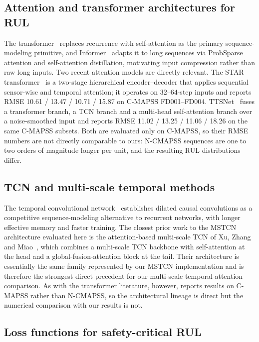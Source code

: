 \subsection{Attention and transformer architectures for RUL}

The transformer~\cite{vaswani2017attention} replaces recurrence with self-attention as the primary sequence-modeling primitive, and Informer~\cite{zhou2021informer} adapts it to long sequences via ProbSparse attention and self-attention distillation, motivating input compression rather than raw long inputs. Two recent attention models are directly relevant. The STAR transformer~\cite{fan2024star} is a two-stage hierarchical encoder--decoder that applies sequential sensor-wise and temporal attention; it operates on $32$--$64$-step inputs and reports RMSE 10.61 / 13.47 / 10.71 / 15.87 on C-MAPSS FD001--FD004. TTSNet~\cite{ttsnet2025} fuses a transformer branch, a TCN branch and a multi-head self-attention branch over a noise-smoothed input and reports RMSE 11.02 / 13.25 / 11.06 / 18.26 on the same C-MAPSS subsets. Both are evaluated only on C-MAPSS, so their RMSE numbers are not directly comparable to ours: N-CMAPSS sequences are one to two orders of magnitude longer per unit, and the resulting RUL distributions differ.

\subsection{TCN and multi-scale temporal methods}

The temporal convolutional network~\cite{bai2018tcn} establishes dilated causal convolutions as a competitive sequence-modeling alternative to recurrent networks, with longer effective memory and faster training. The closest prior work to the MSTCN architecture evaluated here is the attention-based multi-scale TCN of Xu, Zhang and Miao~\cite{xu2024msattn}, which combines a multi-scale TCN backbone with self-attention at the head and a global-fusion-attention block at the tail. Their architecture is essentially the same family represented by our MSTCN implementation and is therefore the strongest direct precedent for our multi-scale temporal-attention comparison. As with the transformer literature, however, \cite{xu2024msattn} reports results on C-MAPSS rather than N-CMAPSS, so the architectural lineage is direct but the numerical comparison with our results is not.

\subsection{Loss functions for safety-critical RUL}

